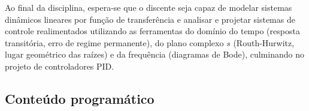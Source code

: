\documentclass[oneside,a4paper,12pt]{article}
\begin{document}
Ao final da disciplina, espera-se que o discente seja capaz de modelar sistemas dinâmicos lineares por função de transferência e analisar e projetar sistemas de controle realimentados utilizando as ferramentas do domínio do tempo (resposta transitória, erro de regime permanente), do plano complexo $s$ (Routh-Hurwitz, lugar geométrico das raízes) e da frequência (diagramas de Bode), culminando no projeto de controladores PID.


  \begin{snugshade}
  \section{Conteúdo programático} %
  \end{snugshade}
\end{document}

